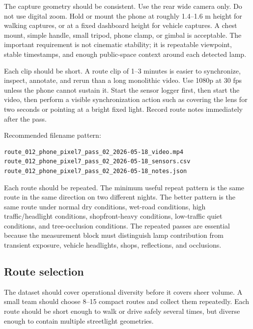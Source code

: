 \documentclass[11pt]{article}
\begin{document}
The capture geometry should be consistent. Use the rear wide camera only. Do not use digital zoom. Hold or mount the phone at roughly 1.4--1.6 m height for walking captures, or at a fixed dashboard height for vehicle captures. A chest mount, simple handle, small tripod, phone clamp, or gimbal is acceptable. The important requirement is not cinematic stability; it is repeatable viewpoint, stable timestamps, and enough public-space context around each detected lamp.

Each clip should be short. A route clip of 1--3 minutes is easier to synchronize, inspect, annotate, and rerun than a long monolithic video. Use 1080p at 30 fps unless the phone cannot sustain it. Start the sensor logger first, then start the video, then perform a visible synchronization action such as covering the lens for two seconds or pointing at a bright fixed light. Record route notes immediately after the pass.

Recommended filename pattern:

\begin{lstlisting}
route_012_phone_pixel7_pass_02_2026-05-18_video.mp4
route_012_phone_pixel7_pass_02_2026-05-18_sensors.csv
route_012_phone_pixel7_pass_02_2026-05-18_notes.json
\end{lstlisting}

Each route should be repeated. The minimum useful repeat pattern is the same route in the same direction on two different nights. The better pattern is the same route under normal dry conditions, wet-road conditions, high traffic/headlight conditions, shopfront-heavy conditions, low-traffic quiet conditions, and tree-occlusion conditions. The repeated passes are essential because the measurement block must distinguish lamp contribution from transient exposure, vehicle headlights, shops, reflections, and occlusions.

\subsection{Route selection}

The dataset should cover operational diversity before it covers sheer volume. A small team should choose 8--15 compact routes and collect them repeatedly. Each route should be short enough to walk or drive safely several times, but diverse enough to contain multiple streetlight geometries.
\end{document}
